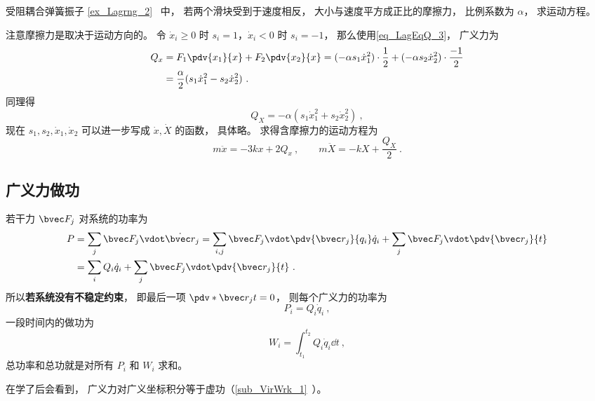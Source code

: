 \begin{example}{受阻耦合弹簧振子}
\autoref{ex_Lagrng_2}~ 中， 若两个滑块受到于速度相反， 大小与速度平方成正比的摩擦力， 比例系数为 $\alpha$， 求运动方程。

注意摩擦力是取决于运动方向的。 令 $\dot x_i \geqslant 0$ 时 $s_i = 1$，$\dot x_i < 0$ 时 $s_i = -1$， 那么使用\autoref{eq_LagEqQ_3}， 广义力为
\begin{equation}
\begin{aligned}
Q_x &= F_1 \pdv{x_1}{x} + F_2 \pdv{x_2}{x} = (-\alpha s_1\dot x_1^2) \cdot \frac{1}{2} + (-\alpha s_2\dot x_2^2) \cdot \frac{-1}{2}\\
&= \frac{\alpha}{2}(s_1\dot x_1^2 - s_2 \dot x_2^2)~.
\end{aligned}
\end{equation}
同理得
\begin{equation}
Q_X = -\alpha(s_1 \dot x_1^2 + s_2\dot x_2^2)~,
\end{equation}
现在 $s_1,s_2,\dot x_1,\dot x_2$ 可以进一步写成 $\dot x, \dot X$ 的函数， 具体略。 求得含摩擦力的运动方程为
\begin{equation}
m\ddot x =  - 3kx + 2Q_x~, \qquad
m\ddot X =  - kX + \frac{Q_X}{2}~.
\end{equation}
\end{example}

\subsection{广义力做功}\label{sub_LagEqQ_1}
若干力 $\bvec F_j$ 对系统的功率为
\begin{equation}\label{eq_LagEqQ_5}
\begin{aligned}
P &= \sum_j \bvec F_j \vdot \dot{\bvec r}_j
= \sum_{i,j} \bvec F_j \vdot \pdv{\bvec r_j}{q_i}\dot q_i + \sum_j \bvec F_j \vdot \pdv{\bvec r_j}{t}\\
&= \sum_i Q_i \dot q_i + \sum_j \bvec F_j \vdot \pdv{\bvec r_j}{t}~.
\end{aligned}
\end{equation}
所以\textbf{若系统没有不稳定约束}， 即最后一项 $\pdv*{\bvec r_j}{t} = 0$， 则每个广义力的功率为
\begin{equation}
P_i = Q_i \dot q_i~,
\end{equation}
一段时间内的做功为
\begin{equation}
W_i = \int_{t_1}^{t_2} Q_i \dot q_i \dd{t}~,
\end{equation}
总功率和总功就是对所有 $P_i$ 和 $W_i$ 求和。

在学了后会看到， 广义力对广义坐标积分等于虚功（\autoref{sub_VirWrk_1}~）。
